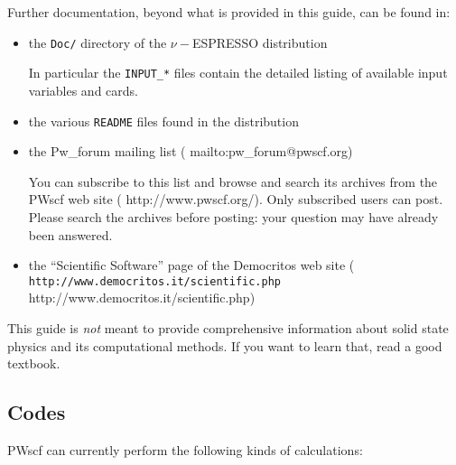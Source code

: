 \documentclass[12pt,a4paper]{article}
\begin{document}
Further documentation, beyond what is provided in this guide, can be
found in:
\begin{itemize}
  \item the \texttt{Doc/} directory of the $\nu-$ESPRESSO distribution

        In particular the \texttt{INPUT\_*} files contain the detailed
        listing of available input variables and cards.
  \item the various \texttt{README} files found in the distribution
  \item the Pw\_forum mailing list
        (%
                           {mailto:pw_forum@pwscf.org})

        You can subscribe to this list and browse and search its
        archives from the PWscf web site
        (%
                           {http://www.pwscf.org/}).
        Only subscribed users can post.
        Please search the archives before posting: your question may
        have already been answered.
  \item the ``Scientific Software'' page of the Democritos web site
        \hfill\break
        (\htmladdnormallink%
         {\texttt{http://www.democritos.it/scientific.php}}%
         {http://www.democritos.it/scientific.php})
\end{itemize}

This guide is \emph{not} meant to provide comprehensive information
about solid state physics and its computational methods.
If you want to learn that, read a good textbook.

\subsection{Codes}

PWscf can currently perform the following kinds of calculations:
\end{document}
